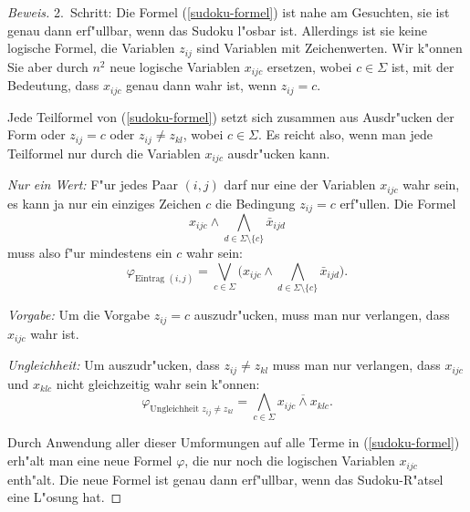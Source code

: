 \begin{proof}[Beweis]
2.~Schritt: Die Formel (\ref{sudoku-formel}) ist nahe am Gesuchten,
sie ist genau dann erf"ullbar, wenn das Sudoku l"osbar ist. Allerdings
ist sie keine logische Formel, die Variablen $z_{ij}$ sind Variablen mit
Zeichenwerten. Wir k"onnen Sie aber durch $n^2$ neue logische Variablen
$x_{ijc}$ ersetzen, wobei $c\in \Sigma$ ist, mit der Bedeutung, dass
$x_{ijc}$ genau dann wahr ist, wenn $z_{ij}=c$. 

Jede Teilformel von (\ref{sudoku-formel}) setzt sich zusammen
aus Ausdr"ucken der Form oder $z_{ij}=c$
oder $z_{ij}\ne z_{kl}$, wobei $c\in\Sigma$.
Es reicht also, wenn man jede Teilformel nur durch die Variablen $x_{ijc}$ 
ausdr"ucken kann.
\begin{compactenum}
\item {\em Nur ein Wert:} F"ur jedes Paar $(i,j)$ darf nur eine der
Variablen $x_{ijc}$ wahr sein, es kann ja nur ein einziges Zeichen $c$
die Bedingung $z_{ij}=c$ erf"ullen. Die Formel
\[
x_{ijc}\wedge \bigwedge_{d\in\Sigma\setminus\{c\}}\bar x_{ijd}
\]
muss also f"ur mindestens ein $c$ wahr sein:
\[
\varphi_{\text{Eintrag $(i,j)$}}
=
\bigvee_{c\in \Sigma}
\biggl(
x_{ijc}\wedge \bigwedge_{d\in\Sigma\setminus\{c\}}\bar x_{ijd}
\biggr).
\]
\item {\em Vorgabe:} Um die Vorgabe $z_{ij}=c$ auszudr"ucken, muss man
nur verlangen, dass $x_{ijc}$ wahr ist.
\item {\em Ungleichheit:} Um auszudr"ucken, dass $z_{ij} \ne z_{kl}$ muss
man nur verlangen, dass $x_{ijc}$ und $x_{klc}$ nicht gleichzeitig wahr
sein k"onnen:
\[
\varphi_{\text{Ungleichheit $z_{ij}\ne z_{kl}$}}
=
\bigwedge_{c\in\Sigma}
\overline{x_{ijc}\wedge x_{klc}}.
\]
\end{compactenum}
Durch Anwendung aller dieser Umformungen auf alle Terme in (\ref{sudoku-formel})
erh"alt man eine neue Formel $\varphi$, die nur noch die logischen
Variablen $x_{ijc}$ enth"alt. Die neue Formel ist genau dann erf"ullbar,
wenn das Sudoku-R"atsel eine L"osung hat.
\end{proof}
